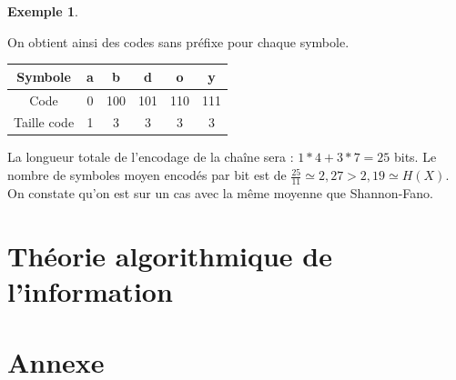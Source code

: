 \documentclass[10pt,a4paper]{article}
\theoremstyle{definition}
\newtheorem{example}{Exemple}
\numberwithin{lemma}{subsection}
\numberwithin{theorem}{subsection}
\numberwithin{definition}{subsection}
\numberwithin{proposition}{subsection}
\numberwithin{corollary}{subsection}
\numberwithin{property}{subsection}
\numberwithin{example}{subsection}
\numberwithin{heuristique}{subsection}
\numberwithin{scenario}{subsection}
\begin{document}
\begin{example}
\begin{itemize}
\begin{center}
\end{center}
\end{itemize}
On obtient ainsi des codes sans préfixe pour chaque symbole.
\par\begin{tabular}{|c|c|c|c|c|c|}
\hline
Symbole & a & b & d & o & y \\
\hline
Code & 0 & 100 & 101 & 110 & 111 \\
\hline
Taille code & 1 & 3 & 3 & 3 & 3 \\
\hline
\end{tabular}
\par La longueur totale de l'encodage de la chaîne sera : $1*4 + 3*7 = 25$ bits. Le nombre de symboles moyen encodés par bit est de $\frac{25}{11} \simeq 2,27 > 2,19 \simeq H(X)$. On constate qu'on est sur un cas avec la même moyenne que Shannon-Fano.
\end{example}


        
        

\section{Théorie algorithmique de l'information}
	
	
\section*{Annexe}
\end{document}
